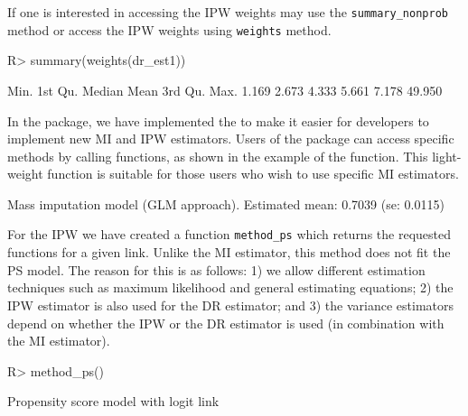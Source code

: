 \documentclass[
]{jss}
\begin{document}
If one is interested in accessing the IPW weights may use the
\texttt{summary\_nonprob} method or access the IPW weights using
\texttt{weights} method.

\begin{CodeChunk}
\begin{CodeInput}
R> summary(weights(dr_est1))
\end{CodeInput}
\begin{CodeOutput}
   Min. 1st Qu.  Median    Mean 3rd Qu.    Max. 
  1.169   2.673   4.333   5.661   7.178  49.950 
\end{CodeOutput}
\end{CodeChunk}

In the package, we have implemented the  to make it
easier for developers to implement new MI and IPW estimators. Users of
the package can access specific methods by calling 
functions, as shown in the example of the  function.
This light-weight function is suitable for those users who wish to use
specific MI estimators.

\begin{CodeChunk}
\begin{CodeOutput}
Mass imputation model (GLM approach). Estimated mean: 0.7039 (se: 0.0115)
\end{CodeOutput}
\end{CodeChunk}

For the IPW we have created a function \texttt{method\_ps} which returns
the requested functions for a given link. Unlike the MI estimator, this
method does not fit the PS model. The reason for this is as follows: 1)
we allow different estimation techniques such as maximum likelihood and
general estimating equations; 2) the IPW estimator is also used for the
DR estimator; and 3) the variance estimators depend on whether the IPW
or the DR estimator is used (in combination with the MI estimator).

\begin{CodeChunk}
\begin{CodeInput}
R> method_ps()
\end{CodeInput}
\begin{CodeOutput}
Propensity score model with logit link
\end{CodeOutput}
\end{CodeChunk}
\end{document}

